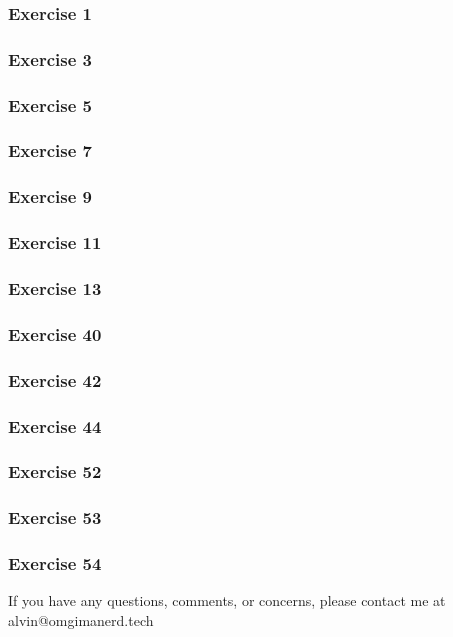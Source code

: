 \documentclass[letterpaper, 12pt]{math}
\begin{document}
\subsubsection*{Exercise 1}
\subsubsection*{Exercise 3}
\subsubsection*{Exercise 5}
\subsubsection*{Exercise 7}
\subsubsection*{Exercise 9}
\subsubsection*{Exercise 11}
\subsubsection*{Exercise 13}
\subsubsection*{Exercise 40}
\subsubsection*{Exercise 42}
\subsubsection*{Exercise 44}
\subsubsection*{Exercise 52}
\subsubsection*{Exercise 53}
\subsubsection*{Exercise 54}

\begin{center}
  If you have any questions, comments, or concerns, please contact me at
  alvin@omgimanerd.tech
\end{center}
\end{document}

